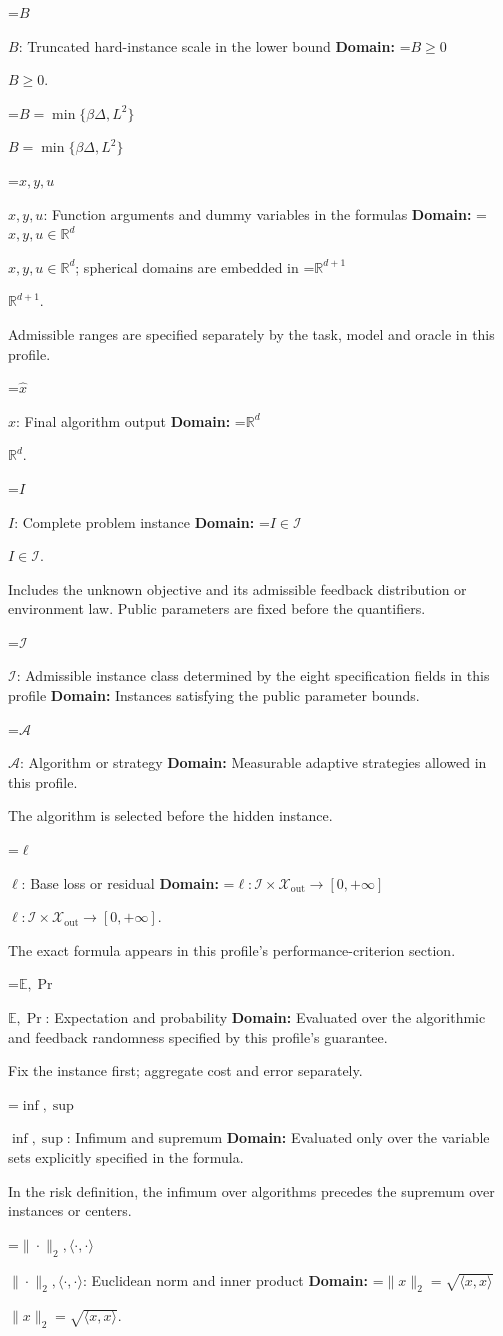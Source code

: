 \documentclass[10pt,a4paper]{article}
\newcommand{\AtlasMath}[1]{\par\begingroup\centering\setbox0=\hbox{$\displaystyle #1$}\ifdim\wd0>1.4\linewidth\typeout{ATLAS WIDE FORMULA: \the\wd0}\fi\ifdim\wd0>\linewidth\resizebox{\linewidth}{!}{\box0}\else\box0\fi\par\endgroup}
\newcommand{\AtlasInlineMath}[1]{\begingroup\setbox0=\hbox{$#1$}\ifdim\wd0>.4\linewidth\endgroup\AtlasMath{#1}\else\endgroup$#1$\fi}
\begin{document}
\AtlasInlineMath{B}: Truncated hard-instance scale in the lower bound \textbf{Domain:} \AtlasInlineMath{B\ge0}.

\AtlasInlineMath{B=\min\{\beta\Delta,L^2\}}

\AtlasInlineMath{x,y,u}: Function arguments and dummy variables in the formulas \textbf{Domain:} \AtlasInlineMath{x,y,u\in\mathbb{R}^d}; spherical domains are embedded in \AtlasInlineMath{\mathbb{R}^{d+1}}.

Admissible ranges are specified separately by the task, model and oracle in this profile.

\AtlasInlineMath{\widehat{x}}: Final algorithm output \textbf{Domain:} \AtlasInlineMath{\mathbb{R}^d}.

\AtlasInlineMath{I}: Complete problem instance \textbf{Domain:} \AtlasInlineMath{I\in\mathcal{I}}.

Includes the unknown objective and its admissible feedback distribution or environment law. Public parameters are fixed before the quantifiers.

\AtlasInlineMath{\mathcal{I}}: Admissible instance class determined by the eight specification fields in this profile \textbf{Domain:} Instances satisfying the public parameter bounds.

\AtlasInlineMath{\mathcal{A}}: Algorithm or strategy \textbf{Domain:} Measurable adaptive strategies allowed in this profile.

The algorithm is selected before the hidden instance.

\AtlasInlineMath{\ell}: Base loss or residual \textbf{Domain:} \AtlasInlineMath{\ell:\mathcal{I}\times\mathcal{X}_{\mathrm{out}}\to[0,+\infty]}.

The exact formula appears in this profile's performance-criterion section.

\AtlasInlineMath{\mathbb{E},\Pr}: Expectation and probability \textbf{Domain:} Evaluated over the algorithmic and feedback randomness specified by this profile's guarantee.

Fix the instance first; aggregate cost and error separately.

\AtlasInlineMath{\inf,\sup}: Infimum and supremum \textbf{Domain:} Evaluated only over the variable sets explicitly specified in the formula.

In the risk definition, the infimum over algorithms precedes the supremum over instances or centers.

\AtlasInlineMath{\|\cdot\|_2,\langle\cdot,\cdot\rangle}: Euclidean norm and inner product \textbf{Domain:} \AtlasInlineMath{\|x\|_2=\sqrt{\langle x,x\rangle}}.
\end{document}
